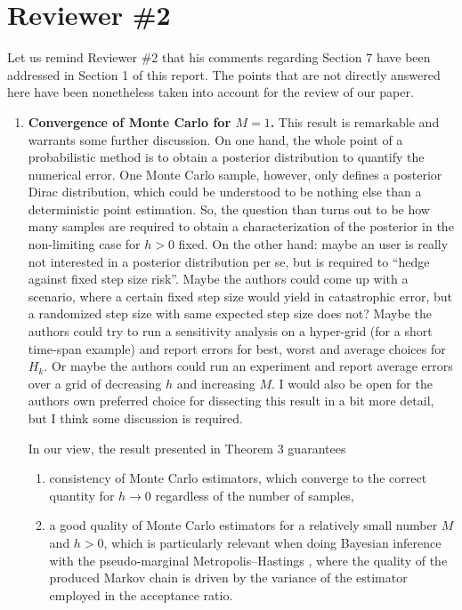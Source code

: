 \documentclass[10pt]{article}
\begin{document}
\section{Reviewer \#2}

Let us remind Reviewer \#2 that his comments regarding Section 7 have been addressed in Section 1 of this report. The points that are not directly answered here have been nonetheless taken into account for the review of our paper.
 
\begin{enumerate}
	\item 
	\begin{itquote}
		\textbf{Convergence of Monte Carlo for $M = 1$.} This result is remarkable and warrants some further discussion. On one hand, the whole point of a probabilistic method is to obtain a posterior distribution to quantify the numerical error. One Monte Carlo sample, however, only defines a posterior Dirac distribution, which could be understood	to be nothing else than a deterministic point estimation. So, the question than turns out to be how many samples are required to obtain a characterization of	the posterior in the non-limiting case for $h > 0$ fixed. On the other hand: maybe an user is really not interested in a posterior distribution per se, but is required to ``hedge against fixed step size risk''. Maybe the authors could come up with a scenario, where a certain fixed step size would yield in catastrophic error, but a randomized step size with same expected step size does not? Maybe the authors could try to run a sensitivity analysis on a hyper-grid (for a short time-span example) and report errors for best, worst and average choices for $H_k$. Or maybe the authors could run an experiment and report average errors over a grid of decreasing $h$ and increasing $M$. I would also be open for the authors own preferred choice for dissecting this result in a bit more detail, but I think some discussion is required.
	\end{itquote}
	In our view, the result presented in Theorem 3 guarantees 
	\begin{enumerate}[label=\alph*.]
		\item consistency of Monte Carlo estimators, which converge to the correct quantity for $h \to 0$ regardless of the number of samples,
		\item a good quality of Monte Carlo estimators for a relatively small number $M$ and $h > 0$, which is particularly relevant when doing Bayesian inference with the pseudo-marginal Metropolis--Hastings \cite{AnR09}, where the quality of the produced Markov chain is driven by the variance of the estimator employed in the acceptance ratio.

\end{enumerate}
\end{enumerate}
\end{document}

